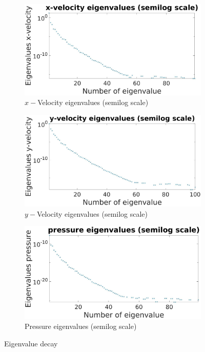 \documentclass[graybox]{svmult}
\begin{document}
\begin{figure}[H]
\begin{subfigure}{0.31\textwidth}
\includegraphics[width=\linewidth]{x_velocity_eigen_value_semilog.jpg}
\caption{$x-$Velocity eigenvalues (semilog scale)} \label{vel_x_ev}
\end{subfigure}\hspace*{\fill}
\begin{subfigure}{0.31\textwidth}
\includegraphics[width=\linewidth]{y_velocity_eigen_value_semilog.jpg}
\caption{$y-$Velocity eigenvalues (semilog scale)} \label{vel_y_ev}
\end{subfigure}
\begin{subfigure}{0.31\textwidth}
\includegraphics[width=\linewidth]{pressure_eigen_value_semilog.jpg}
\caption{Pressure eigenvalues (semilog scale)} \label{pressure_ev}
\end{subfigure}
\caption{Eigenvalue decay}\label{ev_decay}
\end{figure}



%
\end{document}
